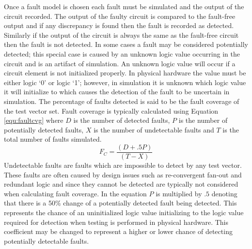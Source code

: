 \documentclass[12pt]{report}
\begin{document}
Once a fault model is chosen each fault must be simulated and the output of the circuit recorded.  The output of the faulty circuit is compared to the fault-free output and if any discrepancy is found then the fault is recorded as detected.  Similarly if the output of the circuit is always the same as the fault-free circuit then the fault is not detected\cite{defectforcmos}.  In some cases a fault may be considered potentially detected; this special case is caused by an unknown logic value occurring in the circuit and is an artifact of simulation.  An unknown logic value will occur if a circuit element is not initialized properly\cite{stroud}.  In physical hardware the value must be either logic `0' or logic `1'; however, in simulation it is unknown which logic value it will initialize to which causes the detection of the fault to be uncertain in simulation\cite{stroud}.  The percentage of faults detected is said to be the fault coverage of the test vector set\cite{defectforcmos}\cite{stroud}.  Fault coverage is typically calculated using Equation \ref{equ:faultcvg} where $D$ is the number of detected faults, $P$ is the number of potentially detected faults, $X$ is the number of undetectable faults and $T$ is the total number of faults simulated\cite{stroud}.  
\begin{equation}
F_C = \frac{(D + .5P)}{(T - X)}
\label{equ:faultcvg}
\end{equation}
Undetectable faults are faults which are impossible to detect by any test vector.  These faults are often caused by design issues such as re-convergent fan-out and redundant logic\cite{stroud} and since they cannot be detected are typically not considered when calculating fault coverage.  In the equation $P$ is multiplied by $.5$ denoting that there is a 50\% change of a potentially detected fault being detected.  This represents the chance of an uninitialized logic value initializing to the logic value required for detection when testing is performed in physical hardware.  This coefficient may be changed to represent a higher or lower chance of detecting potentially detectable faults\cite{stroud}.
\end{document}
